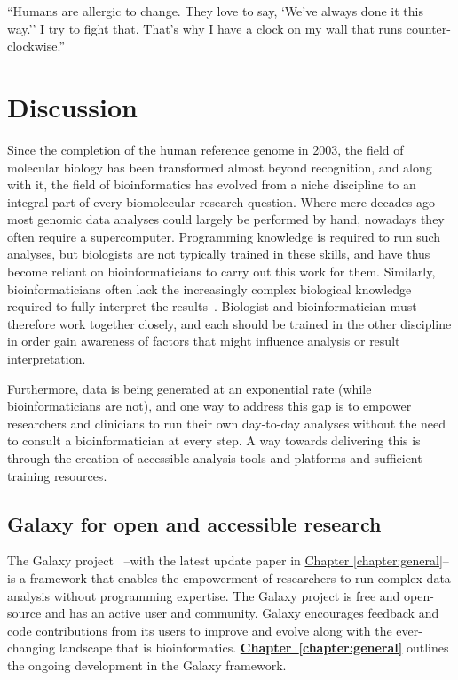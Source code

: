 \begin{savequote}[75mm]
``Humans are allergic to change. They love to say, `We've always done it this way.'' I try to fight that. That's why I have a clock on my wall that runs counter-clockwise.''
\end{savequote}

\chapter{Discussion}\label{discussion}
\setcounter{figure}{-1}
\setcounter{table}{-1}
\setcounter{section}{-1}
\setcounter{NAT@ctr}{-1}

Since the completion of the human reference genome in 2003, the field of molecular biology has been transformed almost beyond recognition, and along with it, the field of bioinformatics has evolved from a niche discipline to an integral part of every biomolecular research question. Where mere decades ago most genomic data analyses could largely be performed by hand, nowadays they often require a supercomputer. Programming knowledge is required to run such analyses, but biologists are not typically trained in these skills, and have thus become reliant on bioinformaticians to carry out this work for them. Similarly, bioinformaticians often lack the increasingly complex biological knowledge required to fully interpret the results~\cite{preeyanon2014reproducible}. Biologist and bioinformatician must therefore work together closely, and each should be trained in the other discipline in order gain awareness of factors that might influence analysis or result interpretation.

Furthermore, data is being generated at an exponential rate (while bioinformaticians are not), and one way to address this gap is to empower researchers and clinicians to run their own day-to-day analyses without the need to consult a bioinformatician at every step. A way towards delivering this is through the creation of accessible analysis tools and platforms and sufficient training resources.


\section{Galaxy for open and accessible research}
The Galaxy project~\cite{giardine2005galaxy,blankenberg2010galaxy,afgan2016galaxy} --with the latest update paper \cite{afgan2018galaxy} in \hyperref[chapter:galaxy]{Chapter \ref{chapter:general}}-- is a framework that enables the empowerment of researchers to run complex data analysis without programming expertise. The Galaxy project is free and open-source and has an active user and community. Galaxy encourages feedback and code contributions from its users to improve and evolve along with the ever-changing landscape that is bioinformatics. \hyperref[chapter:galaxy]{\textbf{Chapter~\ref{chapter:general}}} outlines the ongoing development in the Galaxy framework.

